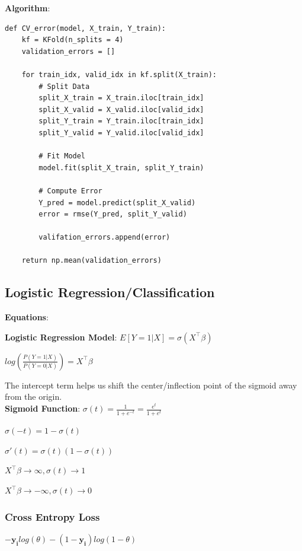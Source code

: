 \documentclass[8pt]{extarticle}
\begin{document}
\textbf{Algorithm}:
\begin{verbatim}
def CV_error(model, X_train, Y_train):
    kf = KFold(n_splits = 4)
    validation_errors = []
    
    for train_idx, valid_idx in kf.split(X_train):
        # Split Data
        split_X_train = X_train.iloc[train_idx]
        split_X_valid = X_valid.iloc[valid_idx]
        split_Y_train = Y_train.iloc[train_idx]
        split_Y_valid = Y_valid.iloc[valid_idx]
        
        # Fit Model
        model.fit(split_X_train, split_Y_train)
        
        # Compute Error
        Y_pred = model.predict(split_X_valid)
        error = rmse(Y_pred, split_Y_valid)
        
        valifation_errors.append(error)
        
    return np.mean(validation_errors)

\end{verbatim}

\hline

\subsection*{Logistic Regression/Classification}
\textbf{Equations}:\par
\textbf{Logistic Regression Model}: $E[Y=1|X]=\sigma(X^\top \beta)$\par
$log(\frac{P(Y=1|X)}{P(Y=0|X)}) = X^\top \beta$ \par
The intercept term helps us shift the center/inflection point of the sigmoid away from the origin.\\

\textbf{Sigmoid Function}: $\sigma(t)= \frac{1}{1+e^{-t}} = \frac{e^t}{1+e^t}$ \par
$\sigma(-t) = 1-\sigma(t)$ \par
$\sigma'(t) = \sigma(t)(1-\sigma(t))$ \par
$X^\top \beta \rightarrow \infty, \sigma(t)\rightarrow 1$\par
$X^\top \beta \rightarrow -\infty, \sigma(t)\rightarrow 0$ \par

\subsubsection*{Cross Entropy Loss}
$-\mathbf{y_i}log(\theta) - (1-\mathbf{y_i})log(1-\theta)$ \\
\end{document}
